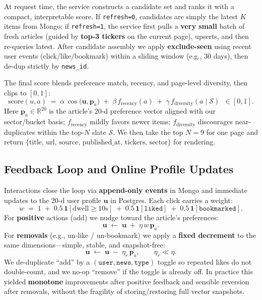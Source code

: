At request time, the service constructs a candidate set and ranks it with a compact, interpretable score. If \texttt{refresh=0}, candidates are simply the latest \(K\) items from Mongo; if \texttt{refresh=1}, the service first pulls a \textbf{very small} batch of fresh articles (guided by \textbf{top-3 tickers} on the current page), upserts, and then re-queries latest. After candidate assembly we apply \textbf{exclude-seen} using recent user events (click/like/bookmark) within a sliding window (e.g., 30 days), then de-dup strictly by \texttt{news\_id}.

The final score blends preference match, recency, and page-level diversity, then clips to \([0,1]\):
\[
\mathrm{score}(u,a)\;=\;
\alpha\,\cos\!\big(\mathbf{u},\mathbf{p}_a\big)
\;+\;\beta\,f_{\text{recency}}(a)
\;+\;\gamma\,f_{\text{diversity}}(a\mid\mathcal{S})
\;\;\in[0,1].
\]
Here \(\mathbf{p}_a\in\mathbb{R}^{20}\) is the article’s 20-d preference vector aligned with our sector/bucket basis; \(f_{\text{recency}}\) mildly favors newer items; \(f_{\text{diversity}}\) discourages near-duplicates within the top-\(N\) slate \(\mathcal{S}\). We then take the top \(N=9\) for one page and return \(\{\text{title, url, source, published\_at, tickers, sector}\}\) for rendering.

\subsection{Feedback Loop and Online Profile Updates}

Interactions close the loop via \textbf{append-only events} in Mongo and immediate updates to the 20-d user profile \(\mathbf{u}\) in Postgres. Each click carries a weight:
\[
w \;=\; 1 \;+\; 0.5\,\mathbf{1}[\text{dwell}\ge 10\text{s}]
\;+\; 0.5\,\mathbf{1}[\texttt{liked}]
\;+\; 0.5\,\mathbf{1}[\texttt{bookmarked}].
\]
For \textbf{positive} actions (add) we nudge toward the article’s preferences:
\[
\mathbf{u} \;\leftarrow\; \mathbf{u} \;+\; \eta\,w\,\mathbf{p}_a.
\]
For \textbf{removals} (e.g., un-like / un-bookmark) we apply a \textbf{fixed decrement} to the same dimensions---simple, stable, and snapshot-free:
\[
\mathbf{u} \;\leftarrow\; \mathbf{u} \;-\; \eta_r\,\mathbf{p}_a,
\qquad \eta_r \ll \eta .
\]
We de-duplicate ``add'' by a \((\texttt{user}, \texttt{news}, \texttt{type})\) toggle so repeated likes do not double-count, and we no-op ``remove'' if the toggle is already off. In practice this yielded \textbf{monotone} improvements after positive feedback and sensible reversion after removals, without the fragility of storing/restoring full vector snapshots.

